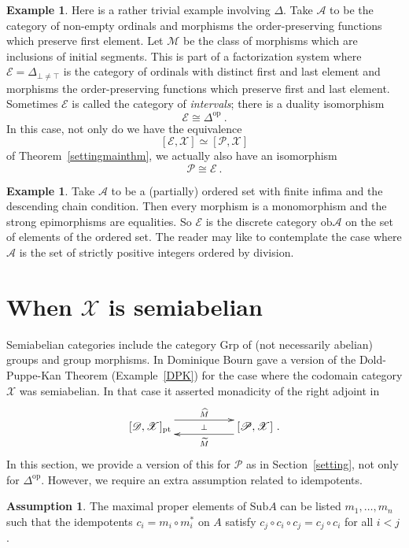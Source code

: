 \documentclass[a4paper,12pt,reqno]{amsart}
\theoremstyle{definition}
\newtheorem{example}[theorem]{Example}
\newtheorem{assumption}[theorem]{Assumption}
\theoremstyle{fact}
\theoremstyle{genquest}
\theoremstyle{step}
\def\CA{{\mathscr A}}
\def\CD{{\mathscr D}}
\def\CE{{\mathscr E}}
\def\CM{{\mathscr M}}
\def\CP{{\mathscr P}}
\def\CX{{\mathscr X}}
\begin{document}
\begin{example}
Here is a rather trivial example involving $\Delta$.
Take $\CA$ to be the category of non-empty ordinals and morphisms
the order-preserving functions which preserve first element.
Let $\CM$ be the class of morphisms which are inclusions of
initial segments. This is part of a factorization system where
$\CE = \Delta_{\bot \neq \top}$ is the category of ordinals with 
distinct first and last element 
and morphisms the order-preserving functions which preserve first 
and last element. Sometimes $\CE$ is called the category of {\em intervals}; there is a duality isomorphism
$$\CE \cong \Delta^{\mathrm{op}} \ .$$ 
In this case, not only do we have the equivalence
$$[\CE, \CX] \simeq [\CP, \CX] $$
of Theorem~\ref{settingmainthm}, we actually also have an isomorphism
$$\CP \cong \CE \ .$$
\end{example}

\begin{example}
Take $\CA$ to be a (partially) ordered set with finite infima and the descending chain condition. 
Then every morphism is a monomorphism
and the strong epimorphisms are equalities. So $\CE$ is
the discrete category $\mathrm{ob}\CA$ on the set of
elements of the ordered set. The reader may like to contemplate
the case where $\CA$ is the set of strictly positive integers
ordered by division. 
\end{example} 

\section{When $\CX$ is semiabelian}\label{semiabelian}

Semiabelian categories include the category $\mathrm{Grp}$ of 
(not necessarily abelian) groups and group morphisms.
In \cite{Bourn07} Dominique Bourn gave a version of the Dold-Puppe-Kan Theorem (Example~\ref{DPK})
for the case where the codomain category $\CX$ was semiabelian.
In that case it asserted monadicity of the right adjoint in 
\begin{equation}\label{pttedkeradj} 
\xymatrix @R-3mm {
[\CD,\CX]_{\mathrm{pt}} \ar@<1.5ex>[rr]^{\widehat{M}} \ar@{}[rr]|-{\bot} && [\CP,\CX]
 \ar@<1.5ex>[ll]^{\widetilde{M}} \ .
}
\end{equation} 
In this section, we provide a version of this for $\CP$ as in Section~\ref{setting},
not only for $\Delta^{\mathrm{op}}$. 
However, we require an extra assumption related to idempotents. 

\begin{assumption}\label{ass7}
The maximal proper elements of $\mathrm{Sub}A$ can be listed $m_1, \dots, m_n$ 
such that the idempotents $c_i = m_i \circ m_i^*$ on $A$ satisfy 
$c_j\circ c_i\circ c_j=c_j\circ c_i$ for all $i< j$. 
\end{assumption}
\end{document}
